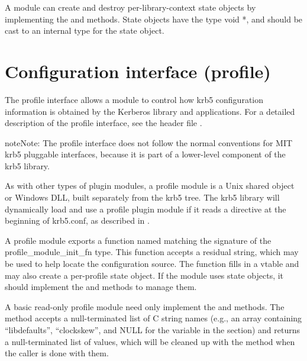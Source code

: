 \documentclass[letterpaper,10pt,english]{sphinxmanual}
\begin{document}
A module can create and destroy per-library-context state objects by
implementing the  and  methods.  State objects have
the type void *, and should be cast to an internal type for the state
object.


\section{Configuration interface (profile)}
\label{\detokenize{plugindev/profile:configuration-interface-profile}}\label{\detokenize{plugindev/profile::doc}}\label{\detokenize{plugindev/profile:profile-plugin}}
The profile interface allows a module to control how krb5
configuration information is obtained by the Kerberos library and
applications.  For a detailed description of the profile interface,
see the header file .

\begin{sphinxadmonition}{note}{Note:}
The profile interface does not follow the normal conventions
for MIT krb5 pluggable interfaces, because it is part of a
lower-level component of the krb5 library.
\end{sphinxadmonition}

As with other types of plugin modules, a profile module is a Unix
shared object or Windows DLL, built separately from the krb5 tree.
The krb5 library will dynamically load and use a profile plugin module
if it reads a  directive at the beginning of krb5.conf, as
described in .

A profile module exports a function named 
matching the signature of the profile\_module\_init\_fn type.  This
function accepts a residual string, which may be used to help locate
the configuration source.  The function fills in a vtable and may also
create a per-profile state object.  If the module uses state objects,
it should implement the  and  methods to manage
them.

A basic read-only profile module need only implement the
 and  methods.  The  method
accepts a null-terminated list of C string names (e.g., an array
containing “libdefaults”, “clockskew”, and NULL for the 
variable in the  section) and returns a
null-terminated list of values, which will be cleaned up with the
 method when the caller is done with them.
\end{document}
